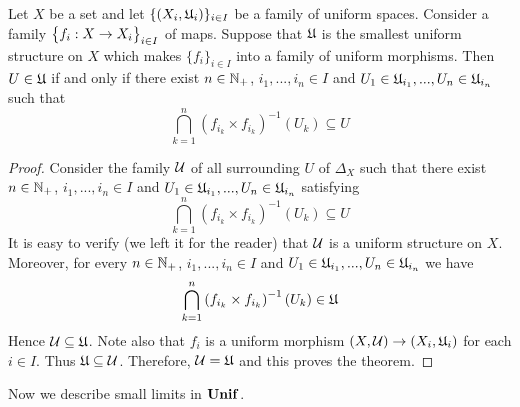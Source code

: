 \begin{theorem}\label{theorem:description_of_uniform_structure_introduced_by_a_family_of_maps}
Let $X$ be a set and let $\{(X_i,{\mathfrak U}_i)\}_{i\in I}$ be a family of uniform spaces. Consider a family $\big\{f_i:X\rightarrow X_i\big\}_{i\in I}$ of maps. Suppose that ${\mathfrak U}$ is the smallest uniform structure on $X$ which makes $\{f_i\}_{i\in I}$ into a family of uniform morphisms. Then $U \in {\mathfrak U}$ if and only if there exist $n\in {\mathbb N}_+$, $i_1,...,i_n\in I$ and $U_1 \in {\mathfrak U}_{i_1},...,U_n\in {\mathfrak U}_{i_n}$ such that
$$\bigcap_{k=1}^n\left(f_{i_k}\times f_{i_k}\right)^{-1}(U_k) \subseteq U$$
\end{theorem}
\begin{proof}
Consider the family ${\mathcal U}$ of all surrounding $U$ of $\Delta_X$ such that there exist $n\in {\mathbb N}_+$, $i_1,...,i_n\in I$ and $U_1 \in {\mathfrak U}_{i_1},...,U_n\in {\mathfrak U}_{i_n}$ satisfying
$$\bigcap_{k=1}^n\left(f_{i_k}\times f_{i_k}\right)^{-1}(U_k) \subseteq U$$
It is easy to verify (we left it for the reader) that ${\mathcal U}$ is a uniform structure on $X$. Moreover, for every $n\in {\mathbb N}_+$, $i_1,...,i_n\in I$ and $U_1 \in {\mathfrak U}_{i_1},...,U_n\in {\mathfrak U}_{i_n}$ we have
$$\bigcap_{k=1}^n\left(f_{i_k}\times f_{i_k}\right)^{-1}(U_k) \in {\mathfrak U}$$
Hence ${\mathcal U} \subseteq {\mathfrak U}$. Note also that $f_i$ is a uniform morphism $(X,{\mathcal U})\rightarrow (X_i,{\mathfrak U}_i)$ for each $i\in I$. Thus ${\mathfrak U} \subseteq {\mathcal U}$. Therefore, ${\mathcal U} = {\mathfrak U}$ and this proves the theorem. 
\end{proof}
\noindent
Now we describe small limits in $\mathbf{Unif}$.

